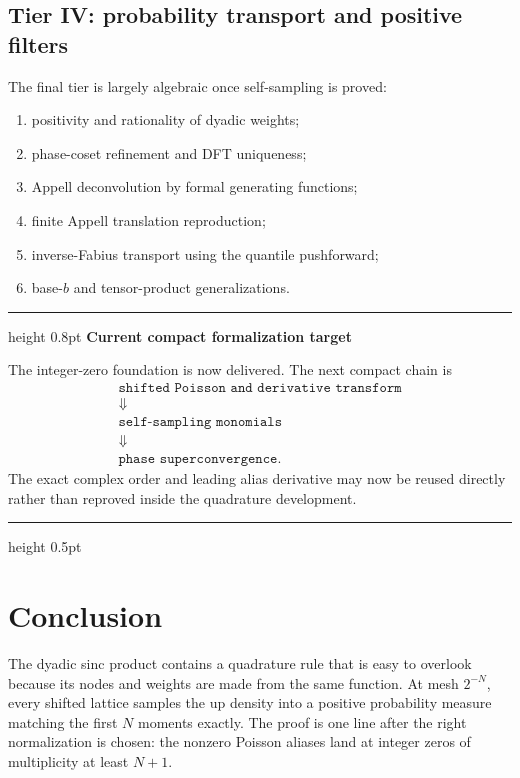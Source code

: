 \documentclass[11pt]{article}
\numberwithin{equation}{section}
\theoremstyle{definition}
\theoremstyle{remark}
\newenvironment{statusbox}[1][]
{\begin{center}\begin{minipage}{0.94\textwidth}%
\color{darkgreen}\hrule height 0.8pt\vspace{0.45em}%
\color{black}\textbf{#1}\par\smallskip}
{\vspace{0.35em}\color{darkgreen}\hrule height 0.5pt\end{minipage}\end{center}}
\begin{document}
\subsection{Tier IV: probability transport and positive filters}

The final tier is largely algebraic once self-sampling is proved:
\begin{enumerate}[label=\textbf{IV.\arabic*}]
\item positivity and rationality of dyadic weights;
\item phase-coset refinement and DFT uniqueness;
\item Appell deconvolution by formal generating functions;
\item finite Appell translation reproduction;
\item inverse-Fabius transport using the quantile pushforward;
\item base-$b$ and tensor-product generalizations.
\end{enumerate}

\begin{statusbox}[Current compact formalization target]
The integer-zero foundation is now delivered.  The next compact chain is
\[
 \begin{gathered}
 \texttt{shifted Poisson and derivative transform}\\
 \Downarrow\\
 \texttt{self-sampling monomials}\\
 \Downarrow\\
 \texttt{phase superconvergence}.
 \end{gathered}
\]
The exact complex order and leading alias derivative may now be reused
directly rather than reproved inside the quadrature development.
\end{statusbox}

\section{Conclusion}
\label{sec:conclusion}

The dyadic sinc product contains a quadrature rule that is easy to overlook because its nodes and weights are made from the same function.  At mesh $2^{-N}$, every shifted lattice samples the up density into a positive probability measure matching the first $N$ moments exactly.  The proof is one line after the right normalization is chosen: the nonzero Poisson aliases land at integer zeros of multiplicity at least $N+1$.
\end{document}
